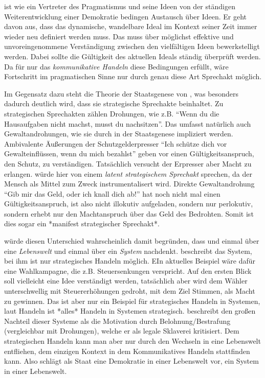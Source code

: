 {\citeauthor{Dewey2010} ist wie \citeauthor{Habermas-1998-aa} ein Vertreter des Pragmatismus und seine Ideen von der ständigen Weiterentwicklung einer Demokratie bedingen Austausch über Ideen.
Er geht davon aus, dass das dynamische, wandelbare Ideal im Kontext seiner Zeit immer wieder neu definiert werden muss.
Das muss über möglichst effektive und unvoreingenommene Verständigung zwischen den vielfältigen Ideen bewerkstelligt werden.
Dabei sollte die Gültigkeit des aktuellen Ideals ständig überprüft werden.
Da für \citeauthor{Habermas-1998-aa} nur das \emph{kommunikative Handeln} diese Bedingungen erfüllt, wäre Fortschritt im pragmatischen Sinne nur durch genau diese Art Sprechakt möglich.

Im Gegensatz dazu steht die Theorie der Staatsgenese von \citeauthor{Tilly-1985-aa}, was besonders dadurch deutlich wird, dass sie strategische Sprechakte beinhaltet.
Zu strategischen Sprechakten zählen Drohungen, wie z.B. ``Wenn du die Hausaufgaben nicht machst, musst du nachsitzen''.
Das umfasst natürlich auch Gewaltandrohungen, wie sie durch \citeauthor{Tilly-1985-aa} in der Staatsgenese impliziert werden.
Ambivalente Äußerungen der Schutzgelderpresser ``Ich schütze dich vor Gewalteinflüssen, wenn du mich bezahlst'' geben vor einen Gültigkeitsanspruch, den Schutz, zu verständigen.
Tatsächlich versucht der Erpresser aber Macht zu erlangen.
\citeauthor{Habermas-1998-aa} würde hier von einem \emph{latent strategischem Sprechakt} sprechen, da der Mensch als Mittel zum Zweck instrumentalisert wird.
Direkte Gewaltandrohung ``Gib mir das Geld, oder ich knall dich ab!'' hat noch nicht mal einen Gültigkeitsanspruch, ist also nicht illokutiv aufgeladen, sondern nur perlokutiv, sondern erhebt nur den Machtanspruch über das Geld des Bedrohten.
Somit ist dies sogar ein *manifest strategischer Sprechakt*.

\citeauthor{Habermas-1998-aa} würde diesen Unterschied wahrscheinlich damit begründen, dass \citeauthor{Tilly-1985-aa} und \citeauthor{Dewey2010} einmal über eine \emph{Lebenswelt} und einmal über ein \emph{System} nachdenkt.
\citeauthor{Tilly-1985-aa} beschreibt das System, bei ihm ist nur strategisches Handeln möglich.
EIn aktuelles Beispiel wäre dafür eine Wahlkampagne, die z.B. Steuersenkungen verspricht.
Auf den ersten Blick soll vielleicht eine Idee verständigt werden, tatsächlich aber wird dem Wähler unterschwellig mit Steuererhöhungen gedroht, mit dem Ziel Stimmen, als Macht zu gewinnen.
Das ist aber nur ein Beispiel für strategisches Handeln in Systemen, laut Handeln ist *alles* Handeln in Systemen strategisch.
\citeauthor{Dewey2010} beschreibt den großen Nachteil dieser Systeme als die Motivation durch Belohnung/Bestrafung (vergleichbar mit Drohungen), welche er als legale Sklaverei kritisiert.
Dem strategischen Handeln kann man aber nur durch den Wechseln in eine Lebenswelt entfliehen, dem einzigen Kontext in dem Kommunikatives Handeln stattfinden kann.
Also schlägt \citeauthor{Dewey2010} als Staat eine Demokratie in einer Lebenswelt vor, ein System in einer Lebenswelt.

}
